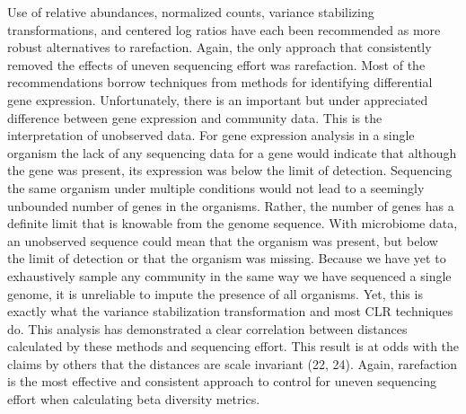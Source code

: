 \documentclass[
]{article}
\begin{document}
Use of relative abundances, normalized counts, variance stabilizing
transformations, and centered log ratios have each been recommended as
more robust alternatives to rarefaction. Again, the only approach that
consistently removed the effects of uneven sequencing effort was
rarefaction. Most of the recommendations borrow techniques from methods
for identifying differential gene expression. Unfortunately, there is an
important but under appreciated difference between gene expression and
community data. This is the interpretation of unobserved data. For gene
expression analysis in a single organism the lack of any sequencing data
for a gene would indicate that although the gene was present, its
expression was below the limit of detection. Sequencing the same
organism under multiple conditions would not lead to a seemingly
unbounded number of genes in the organisms. Rather, the number of genes
has a definite limit that is knowable from the genome sequence. With
microbiome data, an unobserved sequence could mean that the organism was
present, but below the limit of detection or that the organism was
missing. Because we have yet to exhaustively sample any community in the
same way we have sequenced a single genome, it is unreliable to impute
the presence of all organisms. Yet, this is exactly what the variance
stabilization transformation and most CLR techniques do. This analysis
has demonstrated a clear correlation between distances calculated by
these methods and sequencing effort. This result is at odds with the
claims by others that the distances are scale invariant (22, 24). Again,
rarefaction is the most effective and consistent approach to control for
uneven sequencing effort when calculating beta diversity metrics.
\end{document}
